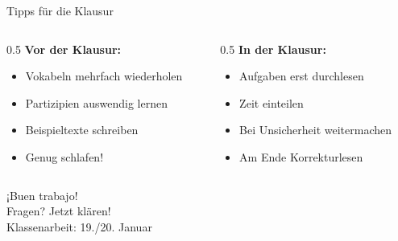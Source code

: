 \documentclass[aspectratio=169, 11pt]{beamer}
\begin{document}

\begin{frame}{Tipps für die Klausur}
    \begin{columns}
        \begin{column}{0.5\textwidth}
            \textbf{Vor der Klausur:}
            \begin{itemize}
                \item Vokabeln mehrfach wiederholen
                \item Partizipien auswendig lernen
                \item Beispieltexte schreiben
                \item Genug schlafen!
            \end{itemize}
        \end{column}
        \begin{column}{0.5\textwidth}
            \textbf{In der Klausur:}
            \begin{itemize}
                \item Aufgaben erst durchlesen
                \item Zeit einteilen
                \item Bei Unsicherheit weitermachen
                \item Am Ende Korrekturlesen
            \end{itemize}
        \end{column}
    \end{columns}

    \vspace{15pt}

    \begin{center}
    \end{center}
\end{frame}


{
\begin{frame}[plain]
    \vfill
    \begin{center}
        {¡Buen trabajo!}\\[20pt]
        {\small Fragen? Jetzt klären!}\\[10pt]
        {\small Klassenarbeit: 19./20. Januar}
    \end{center}
    \vfill
\end{frame}
}
\end{document}
